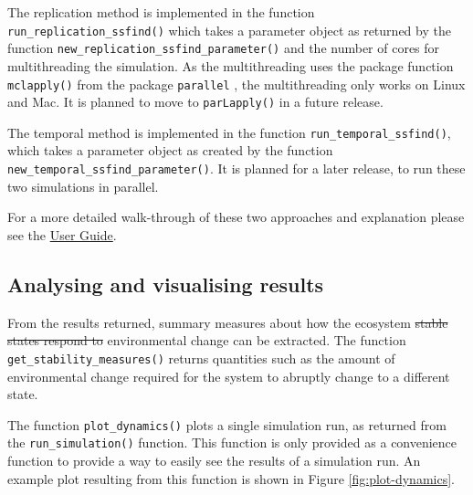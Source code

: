 \documentclass[]{elsarticle} %
\providecommand{\DIFaddtex}[1]{{\protect\color{blue}\uwave{#1}}} %
\providecommand{\DIFdeltex}[1]{{\protect\color{red}\sout{#1}}}                      %
\providecommand{\DIFaddbegin}{} %
\providecommand{\DIFaddend}{} %
\providecommand{\DIFdelbegin}{} %
\providecommand{\DIFdelend}{} %
\providecommand{\DIFadd}[1]{\texorpdfstring{\DIFaddtex{#1}}{#1}} %
\providecommand{\DIFdel}[1]{\texorpdfstring{\DIFdeltex{#1}}{}} %
\newcommand{\DIFscaledelfig}{0.5}
\newlength{\DIFdelgraphicswidth} %
\newlength{\DIFdelgraphicsheight} %
\newcommand{\DIFaddincludegraphics}[2][]{{\color{blue}\fbox{\DIFOincludegraphics[#1]{#2}}}} %
\newcommand{\DIFdelincludegraphics}[2][]{%
\sbox{\DIFdelgraphicsbox}{\DIFOincludegraphics[#1]{#2}}%
\settoboxwidth{\DIFdelgraphicswidth}{\DIFdelgraphicsbox} %
\settoboxtotalheight{\DIFdelgraphicsheight}{\DIFdelgraphicsbox} %
\scalebox{\DIFscaledelfig}{%
\parbox[b]{\DIFdelgraphicswidth}{\usebox{\DIFdelgraphicsbox}\\[-\baselineskip] \rule{\DIFdelgraphicswidth}{0em}}\llap{\resizebox{\DIFdelgraphicswidth}{\DIFdelgraphicsheight}{%
\setlength{\unitlength}{\DIFdelgraphicswidth}%
\begin{picture}(1,1)%
\thicklines\linethickness{2pt} %
{\color[rgb]{1,0,0}\put(0,0){\framebox(1,1){}}}%
{\color[rgb]{1,0,0}\put(0,0){\line( 1,1){1}}}%
{\color[rgb]{1,0,0}\put(0,1){\line(1,-1){1}}}%
\end{picture}%
}\hspace*{3pt}}} %
} %
\DeclareRobustCommand{\DIFaddbegin}{\DIFOaddbegin \let\includegraphics\DIFaddincludegraphics} %
\DeclareRobustCommand{\DIFaddend}{\DIFOaddend \let\includegraphics\DIFOincludegraphics} %
\DeclareRobustCommand{\DIFdelbegin}{\DIFOdelbegin \let\includegraphics\DIFdelincludegraphics} %
\DeclareRobustCommand{\DIFdelend}{\DIFOaddend \let\includegraphics\DIFOincludegraphics} %
\begin{document}
The replication method is implemented in the function \texttt{run\_replication\_ssfind()} which takes a parameter object as returned by the function \texttt{new\_replication\_ssfind\_parameter()} and the number of cores for multithreading the simulation. As the multithreading uses the package function \texttt{mclapply()} from the package \texttt{parallel} \citep{RCoreTeam2022}, the multithreading only works on Linux and Mac. It is planned to move to \texttt{parLapply()} \citep{RCoreTeam2022} in a future release.

The temporal method is implemented in the function \texttt{run\_temporal\_ssfind()}, which takes a parameter object as created by the function \texttt{new\_temporal\_ssfind\_parameter()}. It is planned for a later release, to run these two simulations in parallel.

For a more detailed walk-through of these two approaches and explanation please see the \href{https://uzh-peg.r-universe.dev/articles/microxanox/User-guide.html}{User Guide}.

\hypertarget{analysing-and-visualising-results}{%
\subsection{Analysing and visualising results}\label{analysing-and-visualising-results}}

From the results returned, summary measures about how the ecosystem \DIFdelbegin \DIFdel{stable states respond to }\DIFdelend \DIFaddbegin \DIFadd{final states changes with }\DIFaddend environmental change can be extracted. The function \texttt{get\_stability\_measures()} returns quantities such as the amount of environmental change required for the system to abruptly change to a different state.

The function \texttt{plot\_dynamics()} plots a single simulation run, as returned from the \texttt{run\_simulation()} function. This function is only provided as a convenience function to provide a way to easily see the results of a simulation run. An example plot resulting from this function is shown in Figure \ref{fig:plot-dynamics}.
\end{document}
